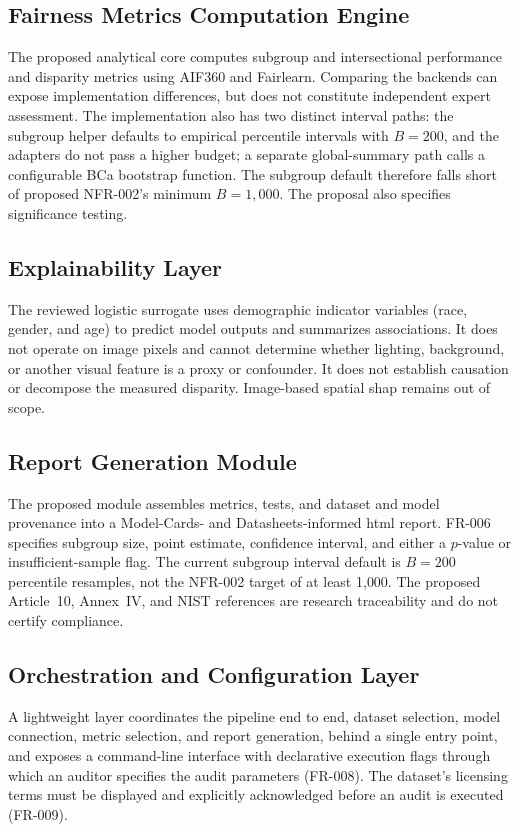 \subsection{Fairness Metrics Computation Engine}
The proposed analytical core computes subgroup and intersectional performance and disparity metrics using AIF360 and Fairlearn. Comparing the backends can expose implementation differences, but does not constitute independent expert assessment. The implementation also has two distinct interval paths: the subgroup helper defaults to empirical percentile intervals with \(B=200\), and the adapters do not pass a higher budget; a separate global-summary path calls a configurable BCa bootstrap function. The subgroup default therefore falls short of proposed NFR-002's minimum \(B=1{,}000\). The proposal also specifies significance testing.

\subsection{Explainability Layer}
The reviewed logistic surrogate uses demographic indicator variables (race, gender, and age) to predict model outputs and summarizes associations. It does not operate on image pixels and cannot determine whether lighting, background, or another visual feature is a proxy or confounder. It does not establish causation or decompose the measured disparity. Image-based spatial \gls{shap} remains out of scope.

\subsection{Report Generation Module}
The proposed module assembles metrics, tests, and dataset and model provenance into a Model-Cards- and Datasheets-informed \gls{html} report. FR-006 specifies subgroup size, point estimate, confidence interval, and either a $p$-value or insufficient-sample flag. The current subgroup interval default is \(B=200\) percentile resamples, not the NFR-002 target of at least 1{,}000. The proposed Article~10, Annex~IV, and NIST references are research traceability and do not certify compliance.

\subsection{Orchestration and Configuration Layer}
A lightweight layer coordinates the pipeline end to end, dataset selection, model connection, metric selection, and report generation, behind a single entry point, and exposes a command-line interface with declarative execution flags through which an auditor specifies the audit parameters (FR-008). The dataset's licensing terms must be displayed and explicitly acknowledged before an audit is executed (FR-009).

